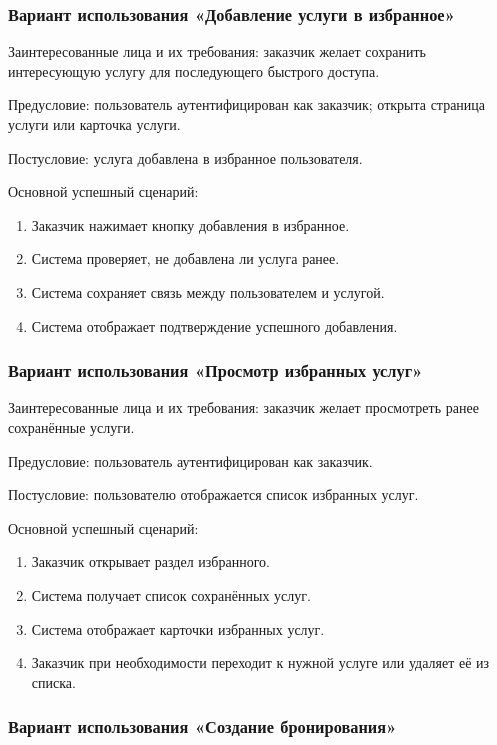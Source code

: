 \subsubsection{Вариант использования «Добавление услуги в избранное»}

Заинтересованные лица и их требования: заказчик желает сохранить интересующую услугу для последующего быстрого доступа.

Предусловие: пользователь аутентифицирован как заказчик; открыта страница услуги или карточка услуги.

Постусловие: услуга добавлена в избранное пользователя.

Основной успешный сценарий:
\begin{enumerate}
	\item Заказчик нажимает кнопку добавления в избранное.
	\item Система проверяет, не добавлена ли услуга ранее.
	\item Система сохраняет связь между пользователем и услугой.
	\item Система отображает подтверждение успешного добавления.
\end{enumerate}

\subsubsection{Вариант использования «Просмотр избранных услуг»}

Заинтересованные лица и их требования: заказчик желает просмотреть ранее сохранённые услуги.

Предусловие: пользователь аутентифицирован как заказчик.

Постусловие: пользователю отображается список избранных услуг.

Основной успешный сценарий:
\begin{enumerate}
	\item Заказчик открывает раздел избранного.
	\item Система получает список сохранённых услуг.
	\item Система отображает карточки избранных услуг.
	\item Заказчик при необходимости переходит к нужной услуге или удаляет её из списка.
\end{enumerate}

\subsubsection{Вариант использования «Создание бронирования»}

